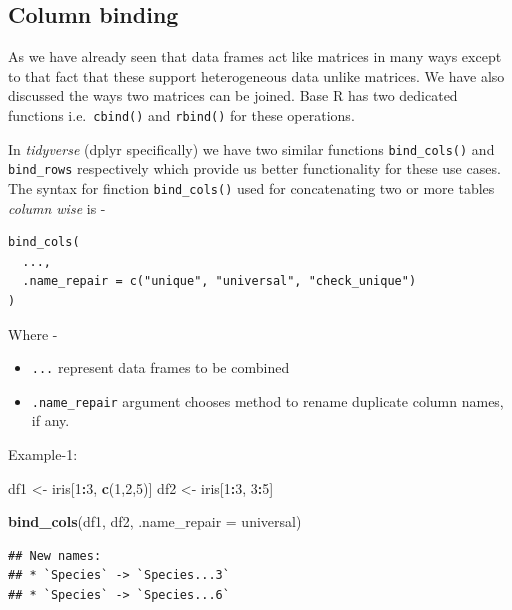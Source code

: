 \documentclass[
]{book}
\newenvironment{Shaded}{\begin{snugshade}}{\end{snugshade}}
\newcommand{\AttributeTok}[1]{\textcolor[rgb]{0.13,0.29,0.53}{#1}}
\newcommand{\DecValTok}[1]{\textcolor[rgb]{0.00,0.00,0.81}{#1}}
\newcommand{\FunctionTok}[1]{\textcolor[rgb]{0.13,0.29,0.53}{\textbf{#1}}}
\newcommand{\NormalTok}[1]{#1}
\newcommand{\OtherTok}[1]{\textcolor[rgb]{0.56,0.35,0.01}{#1}}
\newcommand{\SpecialCharTok}[1]{\textcolor[rgb]{0.81,0.36,0.00}{\textbf{#1}}}
\newcommand{\StringTok}[1]{\textcolor[rgb]{0.31,0.60,0.02}{#1}}
\providecommand{\tightlist}{%
  \setlength{\itemsep}{0pt}\setlength{\parskip}{0pt}}
\begin{document}
\hypertarget{column-binding}{%
\subsection{Column binding}\label{column-binding}}

As we have already seen that data frames act like matrices in many ways except to that fact that these support heterogeneous data unlike matrices. We have also discussed the ways two matrices can be joined. Base R has two dedicated functions i.e.~\texttt{cbind()} and \texttt{rbind()} for these operations.

In \emph{tidyverse} (dplyr specifically) we have two similar functions \texttt{bind\_cols()} and \texttt{bind\_rows} respectively which provide us better functionality for these use cases. The syntax for finction \texttt{bind\_cols()} used for concatenating two or more tables \emph{column wise} is -

\begin{verbatim}
bind_cols(
  ...,
  .name_repair = c("unique", "universal", "check_unique")
)
\end{verbatim}

Where -

\begin{itemize}
\tightlist
\item
  \texttt{...} represent data frames to be combined
\item
  \texttt{.name\_repair} argument chooses method to rename duplicate column names, if any.
\end{itemize}

Example-1:

\begin{Shaded}
\begin{Highlighting}[]
\NormalTok{df1 }\OtherTok{\textless{}{-}}\NormalTok{ iris[}\DecValTok{1}\SpecialCharTok{:}\DecValTok{3}\NormalTok{, }\FunctionTok{c}\NormalTok{(}\DecValTok{1}\NormalTok{,}\DecValTok{2}\NormalTok{,}\DecValTok{5}\NormalTok{)]}
\NormalTok{df2 }\OtherTok{\textless{}{-}}\NormalTok{ iris[}\DecValTok{1}\SpecialCharTok{:}\DecValTok{3}\NormalTok{, }\DecValTok{3}\SpecialCharTok{:}\DecValTok{5}\NormalTok{]}

\FunctionTok{bind\_cols}\NormalTok{(df1, df2, }\AttributeTok{.name\_repair =} \StringTok{\textquotesingle{}universal\textquotesingle{}}\NormalTok{)}
\end{Highlighting}
\end{Shaded}

\begin{verbatim}
## New names:
## * `Species` -> `Species...3`
## * `Species` -> `Species...6`
\end{verbatim}
\end{document}
